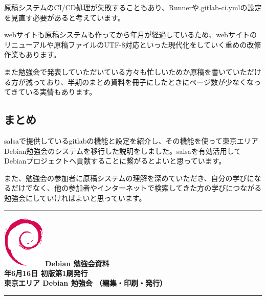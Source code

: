\documentclass[mingoth,a4paper]{jsarticle}
\newcommand{\debmtgyear}{2018}
\newcommand{\debmtgmonth}{6}
\newcommand{\debmtgdate}{16}
\begin{document}
原稿システムのCI/CD処理が失敗することもあり、Runnerや.gitlab-ci.ymlの設定を見直す必要があると考えています。

webサイトも原稿システムも作ってから年月が経過しているため、webサイトのリニューアルや原稿ファイルのUTF-8対応といった現代化をしていく重めの改修作業もあります。

また勉強会で発表していただいている方々も忙しいためか原稿を書いていただける方が減っており、半期のまとめ資料を冊子にしたときにページ数が少なくなってきている実情もあります。


\subsection{まとめ}

salsaで提供しているgitlabの機能と設定を紹介し、その機能を使って東京エリアDebian勉強会のシステムを移行した説明をしました。salsaを有効活用してDebianプロジェクトへ貢献することに繋がるとよいと思っています。

また、勉強会の参加者に原稿システムの理解を深めていただき、自分の学びになるだけでなく、他の参加者やインターネットで検索してきた方の学びにつながる勉強会にしていければよいと思っています。


%
\mbox{}\newpage

\vspace*{15cm}
\hrule
\vspace{2mm}
\includegraphics[width=2cm]{image200502/openlogo-nd.eps}
\noindent \Large \bf Debian 勉強会資料\\
\noindent \normalfont \debmtgyear{}年\debmtgmonth{}月\debmtgdate{}日 \hspace{5mm}  初版第1刷発行\\
\noindent \normalfont 東京エリア Debian 勉強会 （編集・印刷・発行）\\
\hrule
\end{document}
